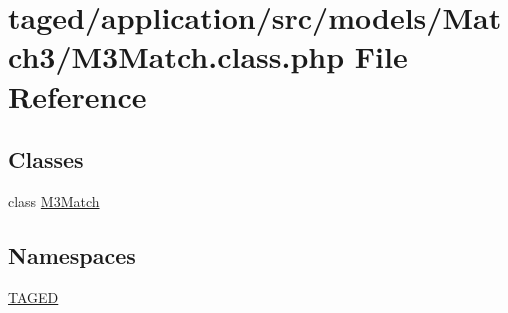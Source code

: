 \hypertarget{_m3_match_8class_8php}{}\section{taged/application/src/models/\+Match3/\+M3\+Match.class.\+php File Reference}
\label{_m3_match_8class_8php}
\subsection*{Classes}
\begin{DoxyCompactItemize}
\item 
class \hyperlink{class_m3_match}{M3\+Match}
\end{DoxyCompactItemize}
\subsection*{Namespaces}
\begin{DoxyCompactItemize}
\item 
 \hyperlink{namespace_t_a_g_e_d}{T\+A\+G\+ED}
\end{DoxyCompactItemize}
